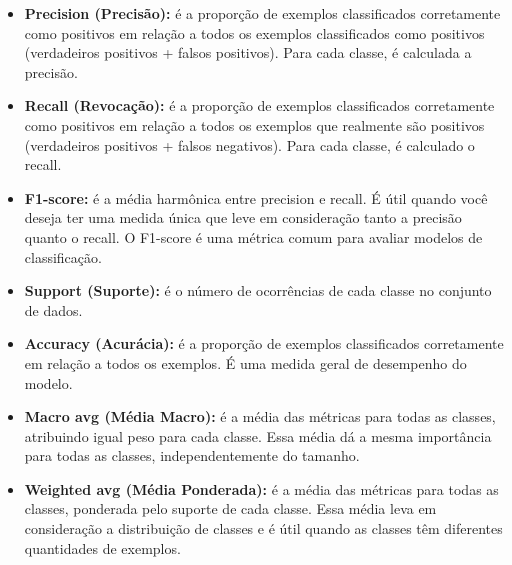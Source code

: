 \documentclass[12pt,oneside,a4paper,chapter=TITLE,
			   english,brazil]{abntex2}
\begin{document}
\begin{itemize}
 

\item \textbf{Precision (Precisão):} é a proporção de exemplos classificados corretamente como positivos em relação a todos os exemplos classificados como positivos (verdadeiros positivos + falsos positivos). Para cada classe, é calculada a precisão.

\item \textbf{Recall (Revocação):} é a proporção de exemplos classificados corretamente como positivos em relação a todos os exemplos que realmente são positivos (verdadeiros positivos + falsos negativos). Para cada classe, é calculado o recall.

\item \textbf{F1-score:} é a média harmônica entre precision e recall. É útil quando você deseja ter uma medida única que leve em consideração tanto a precisão quanto o recall. O F1-score é uma métrica comum para avaliar modelos de classificação.

\item \textbf{Support (Suporte):} é o número de ocorrências de cada classe no conjunto de dados.

\item \textbf{Accuracy (Acurácia):} é a proporção de exemplos classificados corretamente em relação a todos os exemplos. É uma medida geral de desempenho do modelo.

\item \textbf{Macro avg (Média Macro):} é a média das métricas para todas as classes, atribuindo igual peso para cada classe. Essa média dá a mesma importância para todas as classes, independentemente do tamanho.

\item \textbf{Weighted avg (Média Ponderada):} é a média das métricas para todas as classes, ponderada pelo suporte de cada classe. Essa média leva em consideração a distribuição de classes e é útil quando as classes têm diferentes quantidades de exemplos.

\end{itemize}



\end{document}
